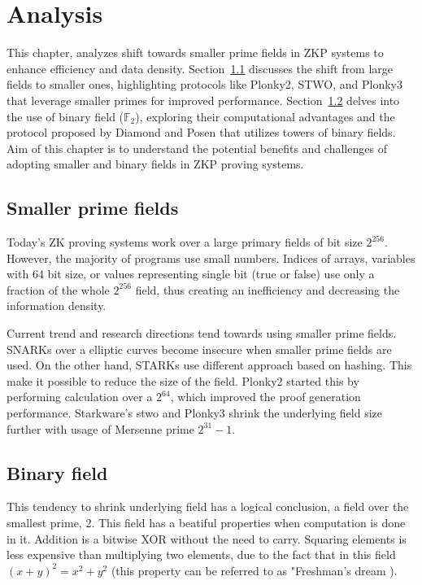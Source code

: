 \chapter{Analysis}

This chapter, analyzes shift towards smaller prime fields in
ZKP systems to enhance efficiency and data density.
Section~\ref{analysis:smaller-prime-fields} discusses the shift from large
fields to smaller ones, highlighting protocols like Plonky2, STWO, and Plonky3
that leverage smaller primes for improved performance. Section~\ref{analysis:binary-fields}
delves into the use of binary field ($\mathbb{F}_2$), exploring their
computational advantages and the protocol proposed by Diamond and Posen
\cite{Binius} that utilizes towers of binary fields. Aim of this chapter is to
understand the potential benefits and challenges of adopting smaller and
binary fields in ZKP proving systems.

\section{Smaller prime fields}\label{analysis:smaller-prime-fields}

Today's ZK proving systems work over a large primary fields of bit size $2^{256}$.
However, the majority of programs use small numbers. Indices of arrays,
variables with 64 bit size, or values representing single bit (true or false)
use only a fraction of the whole $2^{256}$ field, thus creating an inefficiency
and decreasing the information density.

Current trend and research directions tend towards using smaller prime fields.
SNARKs over a elliptic curves become insecure when smaller prime fields are used.
On the other hand, STARKs \cite{SassonSTARKs} use different approach based on hashing.
This make it possible to reduce the size of the field. Plonky2 \cite{Plonky2}
started this by performing calculation over a $2^{64}$, which improved the proof
generation performance. Starkware's stwo \cite{CircleStarks} and Plonky3 \cite{Plonky3}
shrink the underlying field size further with usage of Mersenne prime $2^{31} - 1$.

\section{Binary field}\label{analysis:binary-fields}

This tendency to shrink underlying field has a logical conclusion, a field over
the smallest prime, 2. This field has a beatiful properties when computation is
done in it. Addition is a bitwise XOR without the need to carry. Squaring elements
is less expensive than multiplying two elements, due to the fact that in this
field $(x + y)^2 = x^2 + y^2$ (this property can be referred to as "Freshman's
dream \cite{FreshmansDream}).

